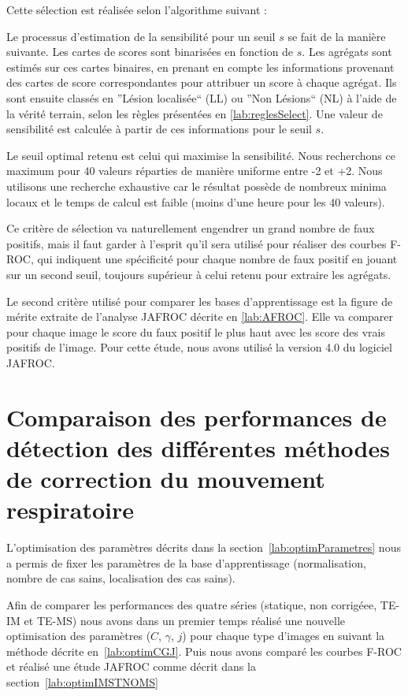 Cette sélection est réalisée selon l'algorithme suivant :

Le processus d'estimation de la sensibilité pour un seuil $s$ se fait de la manière suivante. Les cartes de scores sont binarisées en fonction de $s$. Les agrégats sont estimés sur ces cartes binaires, en prenant en compte les informations provenant des cartes de score correspondantes pour attribuer un score à chaque agrégat. Ils sont ensuite classés en ''Lésion localisée`` (LL) ou ''Non Lésions`` (NL) à l'aide de la vérité terrain, selon les règles présentées en \ref{lab:reglesSelect}. Une valeur de sensibilité est calculée à partir de ces informations pour le seuil $s$.

Le seuil optimal retenu est celui qui maximise la sensibilité. Nous recherchons ce maximum pour 40 valeurs réparties de manière uniforme entre -2 et +2. Nous utilisons une recherche exhaustive car le résultat possède de nombreux minima locaux et le temps de calcul est faible (moins d'une heure pour les 40 valeurs).

Ce critère de sélection va naturellement engendrer un grand nombre de faux positifs, mais il faut garder à l'esprit qu'il sera utilisé pour réaliser des courbes F-ROC, qui indiquent une spécificité pour chaque nombre de faux positif en jouant sur un second seuil, toujours supérieur à celui retenu pour extraire les agrégats.

Le second critère utilisé pour comparer les bases d'apprentissage est la figure de mérite extraite de l'analyse JAFROC décrite en \ref{lab:AFROC}. Elle va comparer pour chaque image le score du faux positif le plus haut avec les score des vrais positifs de l'image. Pour cette étude, nous avons utilisé la version 4.0 du logiciel JAFROC.

\section{Comparaison des performances de détection des différentes méthodes de correction du mouvement respiratoire}

L'optimisation des paramètres décrits dans la section~\ref{lab:optimParametres} nous a permis de fixer les paramètres de la base d'apprentissage (normalisation, nombre de cas sains, localisation des cas sains).

Afin de comparer les performances des quatre séries (statique, non corrigéee, TE-IM et TE-MS) nous avons dans un premier temps réalisé une nouvelle optimisation des paramètres ($C$, $\gamma$, $j$) pour chaque type d'images en suivant la méthode décrite en~\ref{lab:optimCGJ}. Puis nous avons comparé les courbes F-ROC et réalisé une étude JAFROC comme décrit dans la section~\ref{lab:optimIMSTNOMS}



